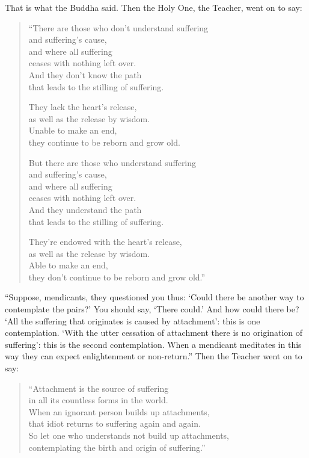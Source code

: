 \documentclass[12pt,openany]{book}%
\begin{document}
That is what the Buddha said. Then the Holy One, the Teacher, went on to say: 

\begin{verse}%
“There are those who don’t understand suffering \\
and suffering’s cause, \\
and where all suffering \\
ceases with nothing left over. \\
And they don’t know the path \\
that leads to the stilling of suffering. 

They lack the heart’s release, \\
as well as the release by wisdom. \\
Unable to make an end, \\
they continue to be reborn and grow old. 

But there are those who understand suffering \\
and suffering’s cause, \\
and where all suffering \\
ceases with nothing left over. \\
And they understand the path \\
that leads to the stilling of suffering. 

They’re endowed with the heart’s release, \\
as well as the release by wisdom. \\
Able to make an end, \\
they don’t continue to be reborn and grow old.” 

%
\end{verse}

“Suppose, mendicants, they questioned you thus: ‘Could there be another way to contemplate the pairs?’ You should say, ‘There could.’ And how could there be? ‘All the suffering that originates is caused by attachment’: this is one contemplation. ‘With the utter cessation of attachment there is no origination of suffering’: this is the second contemplation. When a mendicant meditates in this way they can expect enlightenment or non-return.” Then the Teacher went on to say: 

\begin{verse}%
“Attachment is the source of suffering \\
in all its countless forms in the world. \\
When an ignorant person builds up attachments, \\
that idiot returns to suffering again and again. \\
So let one who understands not build up attachments, \\
contemplating the birth and origin of suffering.” 

%
\end{verse}
\end{document}
